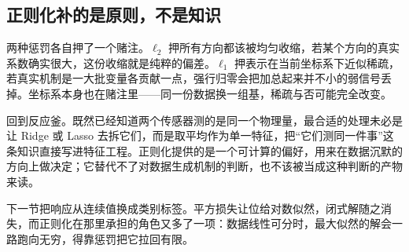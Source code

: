 \subsection{正则化补的是原则，不是知识}

两种惩罚各自押了一个赌注。\(\ell_2\) 押所有方向都该被均匀收缩，若某个方向的真实系数确实很大，这份收缩就是纯粹的偏差。\(\ell_1\) 押表示在当前坐标系下近似稀疏，若真实机制是一大批变量各贡献一点，强行归零会把加总起来并不小的弱信号丢掉。坐标系本身也在赌注里——同一份数据换一组基，稀疏与否可能完全改变。

回到反应釜。既然已经知道两个传感器测的是同一个物理量，最合适的处理未必是让 Ridge 或 Lasso 去拆它们，而是取平均作为单一特征，把``它们测同一件事''这条知识直接写进特征工程。正则化提供的是一个可计算的偏好，用来在数据沉默的方向上做决定；它替代不了对数据生成机制的判断，也不该被当成这种判断的产物来读。

下一节把响应从连续值换成类别标签。平方损失让位给对数似然，闭式解随之消失，而正则化在那里承担的角色又多了一项：数据线性可分时，最大似然的解会一路跑向无穷，得靠惩罚把它拉回有限。
